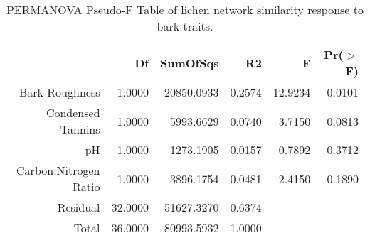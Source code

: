 \begin{table}[ht]
\centering
\begin{tabular}{rrrrrr}
  \hline
 & Df & SumOfSqs & R2 & F & Pr($>$F) \\ 
  \hline
Bark Roughness & 1.0000 & 20850.0933 & 0.2574 & 12.9234 & 0.0101 \\ 
  Condensed Tannins & 1.0000 & 5993.6629 & 0.0740 & 3.7150 & 0.0813 \\ 
  pH & 1.0000 & 1273.1905 & 0.0157 & 0.7892 & 0.3712 \\ 
  Carbon:Nitrogen Ratio & 1.0000 & 3896.1754 & 0.0481 & 2.4150 & 0.1890 \\ 
  Residual & 32.0000 & 51627.3270 & 0.6374 &  &  \\ 
  Total & 36.0000 & 80993.5932 & 1.0000 &  &  \\ 
   \hline
\end{tabular}
\caption{PERMANOVA Pseudo-F Table of lichen network similarity response to bark traits.} 
\label{tab:cn_trait_perm}
\end{table}
